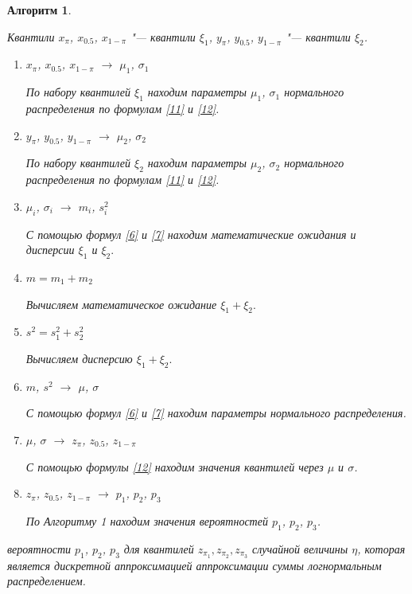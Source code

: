 \documentclass[specialist, substylefile = spbu.rtx,
subf,href,colorlinks=true, 12pt]{disser}
\newtheorem{alg}{Алгоритм}
\newenvironment{pr1}{\par\noindent{\bf Дано:}}{}
\newenvironment{pr3}{\par\noindent{\bf Результат:}}{}
\begin{document}
\begin{alg}\label{al3}
	\begin{pr1}
		Квантили $x_{\pi}$, $x_{0.5}$, $x_{1-\pi}$ "--- квантили $\xi_{1}$, $y_{\pi}$, $y_{0.5}$, $y_{1-\pi}$ "--- квантили $\xi_{2}$.
	\end{pr1}
	\begin{enumerate}
		\item $x_{\pi}$, $x_{0.5}$, $x_{1-\pi}$ $\rightarrow$  $\mu_{1}$, $\sigma_{1}$
		
		По набору квантилей $\xi_{1}$ находим параметры $\mu_{1}$, $\sigma_{1}$ нормального распределения по формулам \eqref{11} и \eqref{12}.
		\item $y_{\pi}$, $y_{0.5}$, $y_{1-\pi}$ $\rightarrow$ $\mu_{2}$, $\sigma_{2}$
		
		По набору квантилей $\xi_{2}$ находим параметры $\mu_{2}$, $\sigma_{2}$ нормального распределения по формулам \eqref{11} и \eqref{12}.
		\item $\mu_{i}$, $\sigma_{i}$ $\rightarrow$ $m_{i}$, $s_{i}^{2}$
		
		С помощью формул \eqref{6} и \eqref{7} находим математические ожидания и дисперсии $\xi_{1}$ и $\xi_{2}.$
		\item $m = m_{1}+m_{2}$
		
		Вычисляем математическое ожидание $\xi_{1}+\xi_{2}.$
		\item $s^{2}=s_{1}^{2} + s_{2}^{2}$
		
		Вычисляем дисперсию $\xi_{1}+\xi_{2}.$
		\item $m$, $s^{2}$ $\rightarrow$ $\mu$, $\sigma$
		
		С помощью формул \eqref{6} и \eqref{7} находим параметры нормального распределения.
		\item $\mu$, $\sigma$ $\rightarrow$ $z_{\pi}$, $z_{0.5}$, $z_{1-\pi}$
		
		С помощью формулы \eqref{12} находим значения квантилей через $\mu$ и $\sigma$.
		\item $z_{\pi}$, $z_{0.5}$, $z_{1-\pi}$ $\rightarrow$ $p_{1}$, $p_{2}$, $p_{3}$
		
		По Алгоритму 1 находим значения вероятностей $p_{1}$, $p_{2}$, $p_{3}$.
	\end{enumerate}
	
	\begin{pr3}\end{pr3} вероятности $p_{1}$, $p_{2}$, $p_{3}$ для квантилей $z_{\pi_{1}}, z_{\pi_{2}}, z_{\pi_{3}}$ случайной величины $\eta$, которая является дискретной аппроксимацией аппроксимации суммы логнормальным распределением.
	
\end{alg}
\end{document}
